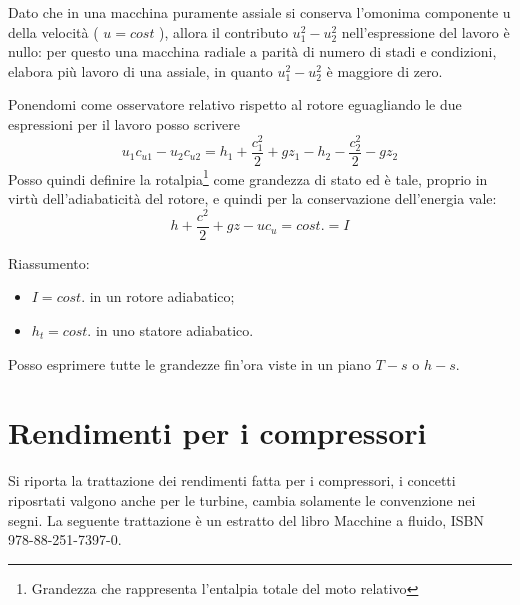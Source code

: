 Dato che in una macchina puramente assiale si conserva l'omonima componente u della velocità ( $u = cost$ ), allora il contributo $u_1^2 - u_2^2$ nell'espressione del lavoro è nullo: per questo una macchina radiale a parità di numero di stadi e condizioni, elabora più lavoro di una assiale, in quanto $u_1^2 - u_2^2$ è maggiore di zero.

Ponendomi come osservatore relativo rispetto al rotore eguagliando le due espressioni per il lavoro posso scrivere
\begin{equation}
u_1 c_{u1} - u_2 c_{u2} = h_1 + \frac{c_1^2}{2}+gz_1-h_2-\frac{c_2^2}{2}-gz_2
\end{equation}
Posso quindi definire la rotalpia\footnote{Grandezza che rappresenta l'entalpia totale del moto relativo} come grandezza di stato ed è tale, proprio in virtù dell'adiabaticità del rotore, e quindi per la conservazione dell'energia vale:
\begin{equation}
h+\frac{c^2}{2}+gz-u c_u = cost. = I
\end{equation}

Riassumento:
\begin{itemize}
\item $I=cost.$ in un rotore adiabatico;
\item $h_t=cost.$ in uno statore adiabatico.
\end{itemize}

Posso esprimere tutte le grandezze fin'ora viste in un piano $T-s$ o $h-s$.

\section{Rendimenti per i compressori}
Si riporta la trattazione dei rendimenti fatta per i compressori, i concetti riposrtati valgono anche per le turbine, cambia solamente le convenzione nei segni. La seguente trattazione è un estratto del libro Macchine a fluido, ISBN 978-88-251-7397-0. 

